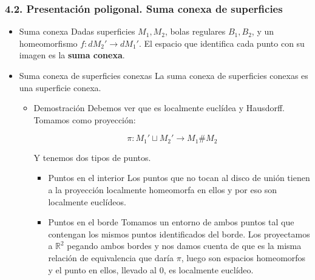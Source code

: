 \documentclass[11pt]{article}
\begin{document}
\subsubsection*{4.2. Presentación poligonal. Suma conexa de superficies}
\label{sec-1-4-6}
\begin{itemize}
\item Suma conexa
\label{sec-1-4-6-1}
Dadas superficies $M_1,M_2$, bolas regulares $B_1,B_2$, y un homeomorfismo
$f : dM_2' \longrightarrow dM_1'$. El espacio que identifica cada punto con su imagen
es la \textbf{suma conexa}.

\item Suma conexa de superficies conexas
\label{sec-1-4-6-2}
La suma conexa de superficies conexas es una superficie conexa.

\begin{itemize}
\item Demostración
\label{sec-1-4-6-2-1}
Debemos ver que es localmente euclídea y Hausdorff. Tomamos como
proyección:

\[
\pi : M_1' \sqcup M_2' \longrightarrow M_1\# M_2
\]

Y tenemos dos tipos de puntos.

\begin{itemize}
\item Puntos en el interior
\label{sec-1-4-6-2-1-1}
Los puntos que no tocan al disco de unión tienen a la proyección
localmente homeomorfa en ellos y por eso son localmente euclídeos.

\item Puntos en el borde
\label{sec-1-4-6-2-1-2}
Tomamos un entorno de ambos puntos tal que contengan los mismos
puntos identificados del borde. Los proyectamos a $\mathbb{R}^2$ pegando
ambos bordes y nos damos cuenta de que es la misma relación de
equivalencia que daría $\pi$, luego son espacios homeomorfos y el
punto en ellos, llevado al $0$, es localmente euclídeo.
\end{itemize}
\end{itemize}
\end{itemize}
\end{document}

